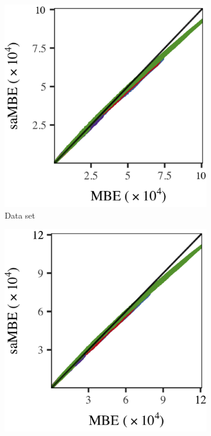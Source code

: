 		\begin{figure}
			\centering
			\begin{subfigure}{0.3\textwidth}
				\centering
				\includegraphics[keepaspectratio=true, width=\textwidth, height=0.23\textheight]{discussion/img/ferdosi_3_120000_mbe_sambe.png}
				\caption{Data set \ferdosiThree}
				\label{fig:discussion:performance:mbevssambe:ferdosi3}
			\end{subfigure}
			\subfigvspace
			\begin{subfigure}{0.3\textwidth}
				\centering
				\includegraphics[keepaspectratio=true, width=\textwidth, height=0.23\textheight]{discussion/img/baakman_3_120000_mbe_sambe.png}

\end{subfigure}
\end{figure}
